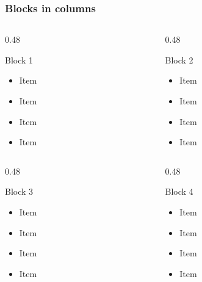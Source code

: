 \begin{frame}[t]
\frametitle{Blocks in columns}
\begin{columns}[T,onlytextwidth]
\begin{column}{0.48\textwidth}
\begin{block}{Block 1}
\begin{itemize}
\item Item
\item Item
\item Item
\item Item
\end{itemize}
\end{block}
\end{column}
\begin{column}{0.48\textwidth}
\begin{block}{Block 2}
\begin{itemize}
\item Item
\item Item
\item Item
\item Item
\end{itemize}
\end{block}
\end{column}
\end{columns}
\vfill
\begin{columns}[T,onlytextwidth]
\begin{column}{0.48\textwidth}
\begin{block}{Block 3}
\begin{itemize}
\item Item
\item Item
\item Item
\item Item
\end{itemize}
\end{block}
\end{column}
\begin{column}{0.48\textwidth}
\begin{block}{Block 4}
\begin{itemize}
\item Item
\item Item
\item Item
\item Item
\end{itemize}
\end{block}
\end{column}
\end{columns}
\end{frame}

